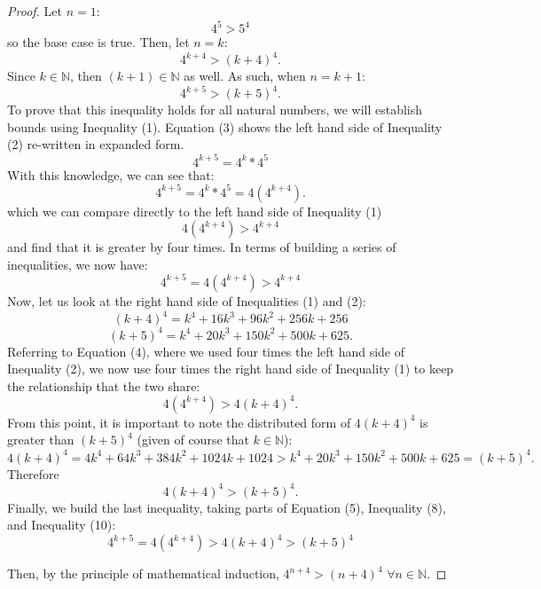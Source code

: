 \documentclass[10pt]{article}
\theoremstyle{definition}
\theoremstyle{plain}
\newcommand{\N}{\mathbb{N}}
\begin{document}
\begin{proof}
  Let $n=1$:
  $$4^5>5^4$$
  so the base case is true.
  Then, let $n=k$:
  \setcounter{equation}{0}
  \begin{equation}
    4^{k+4} > (k+4)^4.
  \end{equation}
    Since $k\in\N$, then $(k+1)\in\N$ as well. As such, when $n=k+1$:
  \begin{equation}
    4^{k+5} > (k+5)^4.
  \end{equation}
  To prove that this inequality holds for all natural numbers, we will establish bounds using Inequality (1). Equation (3) shows the left hand side of Inequality (2) re-written in expanded form.
  \begin{equation}
    4^{k+5} = 4^k*4^5
  \end{equation}
  With this knowledge, we can see that:
  \begin{equation}
    4^{k+5} = 4^k*4^5 = 4(4^{k+4}).
  \end{equation}
  which we can compare directly to the left hand side of Inequality (1)
  \begin{equation*}
    4(4^{k+4}) > 4^{k+4}
  \end{equation*}
  and find that it is greater by four times. In terms of building a series of inequalities, we now have:
  \begin{equation}
    4^{k+5} = 4(4^{k+4}) > 4^{k+4}
  \end{equation}
  Now, let us look at the right hand side of Inequalities (1) and (2):
  \begin{equation}
    (k+4)^4 = k^4 + 16k^3 + 96k^2 + 256k + 256
  \end{equation}
  \begin{equation}
    (k+5)^4 = k^4 + 20k^3 + 150k^2 + 500k + 625.
  \end{equation}
  Referring to Equation (4), where we used four times the left hand side of Inequality (2), we now use four times the right hand side of Inequality (1) to keep the relationship that the two share:
  \begin{equation}
    4(4^{k+4}) > 4(k+4)^4.
  \end{equation}
  From this point, it is important to note the distributed form of $4(k+4)^4$ is greater than $(k+5)^4$ (given of course that $k\in\N$):
  \begin{equation}
    4(k+4)^4 = 4k^4 + 64k^3 + 384k^2 + 1024k + 1024 > k^4 + 20k^3 + 150k^2 + 500k + 625 = (k+5)^4.
  \end{equation}
  Therefore
  \begin{equation}
    4(k+4)^4 > (k+5)^4.
  \end{equation}
  Finally, we build the last inequality, taking parts of Equation (5), Inequality (8), and Inequality (10):
  \begin{equation}
    4^{k+5} = 4(4^{k+4})>4(k+4)^4 > (k+5)^4
  \end{equation}

  Then, by the principle of mathematical induction, $4^{n+4} > (n+4)^4$ $\forall n\in\N$.
\end{proof}
\end{document}
